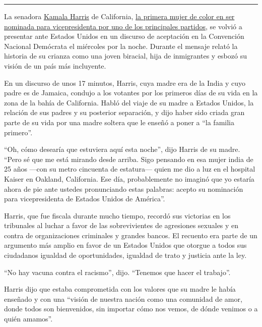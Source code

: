 \begin{center}\rule{0.5\linewidth}{\linethickness}\end{center}

La senadora
\href{https://www.nytimes3xbfgragh.onion/interactive/2020/us/elections/kamala-harris.html}{Kamala
Harris} de California,
\href{https://www.nytimes3xbfgragh.onion/es/2020/08/11/espanol/estados-unidos/kamala-harris-joe-biden-vicepresidenta.html}{la
primera mujer de color en ser nominada para vicepresidenta por uno de
los principales partidos}, se volvió a presentar ante Estados Unidos en
un discurso de aceptación en la Convención Nacional Demócrata el
miércoles por la noche. Durante el mensaje relató la historia de su
crianza como una joven biracial, hija de inmigrantes y esbozó su visión
de un país más incluyente.

En un discurso de unos 17 minutos, Harris, cuya madre era de la India y
cuyo padre es de Jamaica, condujo a los votantes por los primeros días
de su vida en la zona de la bahía de California. Habló del viaje de su
madre a Estados Unidos, la relación de sus padres y su posterior
separación, y dijo haber sido criada gran parte de su vida por una madre
soltera que le enseñó a poner a ``la familia primero''.

``Oh, cómo desearía que estuviera aquí esta noche'', dijo Harris de su
madre. ``Pero sé que me está mirando desde arriba. Sigo pensando en esa
mujer india de 25 años ---con su metro cincuenta de estatura--- quien me
dio a luz en el hospital Kaiser en Oakland, California. Ese día,
probablemente no imaginó que yo estaría ahora de pie ante ustedes
pronunciando estas palabras: acepto su nominación para vicepresidenta de
Estados Unidos de América''.

Harris, que fue fiscala durante mucho tiempo, recordó sus victorias en
los tribunales al luchar a favor de las sobrevivientes de agresiones
sexuales y en contra de organizaciones criminales y grandes bancos. El
recuento era parte de un argumento más amplio en favor de un Estados
Unidos que otorgue a todos sus ciudadanos igualdad de oportunidades,
igualdad de trato y justicia ante la ley.

``No hay vacuna contra el racismo'', dijo. ``Tenemos que hacer el
trabajo''.

Harris dijo que estaba comprometida con los valores que su madre le
había enseñado y con una ``visión de nuestra nación como una comunidad
de amor, donde todos son bienvenidos, sin importar cómo nos vemos, de
dónde venimos o a quién amamos''.

